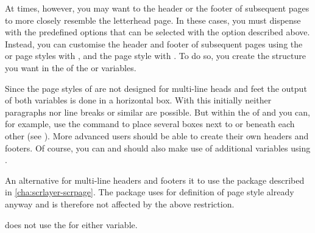 \begin{Declaration}
\end{Declaration}
At times, however, you may want to the header or the footer of subsequent
pages to more closely resemble the letterhead page. In these cases, you must
dispense with the predefined options that can be selected with the
 option
described above.  Instead, you can customise the header and footer of
subsequent pages using the
%
 or
 page
styles with , and the
%
 page
style with .  To do so, you
create the structure you want in the  of
the  or
 variables.

Since the page styles of  are not
designed for multi-line heads and feet the output of both variables is done in
a horizontal box. With this initially neither paragraphs nor line breaks or
similar are possible. But within the  of 
and  you can, for example, use the  command
to place several boxes next to or beneath each other (see
\cite{latex:usrguide-historic}). More advanced users should be able to create
their own headers and footers. Of course, you can and should also make use of
additional variables using .

An alternative for multi-line headers and footers it to use the
%
 package described in
\autoref{cha:scrlayer-scrpage}. The
 package uses for definition
of page style %
already  anyway and is therefore not affected by the
above restriction.

\KOMAScript{} does not use the  for either variable.%
%
%
\EndIndexGroup%
\EndIndexGroup%
\EndIndexGroup


